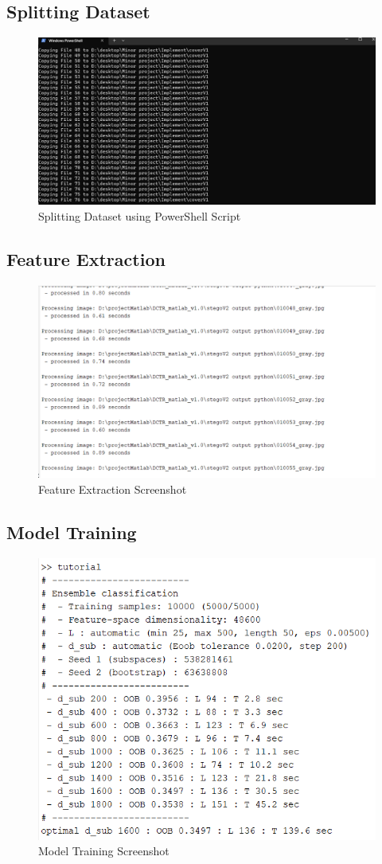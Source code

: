 \subsection{Splitting Dataset}
\begin{figure}[H]
    \centering
    \includegraphics[width=150mm]{./img/splitting.png}
    \caption{Splitting Dataset using PowerShell Script}
\end{figure}
\subsection{Feature Extraction}
\begin{figure}[H]
    \centering
    \includegraphics[width=150mm]{./img/feature_extraction.png}
    \caption{Feature Extraction Screenshot}
\end{figure}
\subsection{Model Training}
\begin{figure}[H]
    \centering
    \includegraphics[width=150mm]{./img/training.png}
    \caption{Model Training Screenshot}
\end{figure}